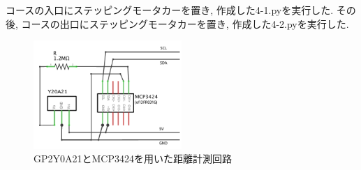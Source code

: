 \documentclass{ltjsarticle} %
\begin{document}
コースの入口にステッピングモータカーを置き, 作成した4-1.pyを実行した. 
その後, コースの出口にステッピングモータカーを置き, 作成した4-2.pyを実行した. 

\begin{figure}[H] %
  \centering
  \includegraphics[width=0.5\textwidth]{fig4.png} %
  \caption{GP2Y0A21とMCP3424を⽤いた距離計測回路} %
  \label{fig:fig4} %
\end{figure}
\end{document}
